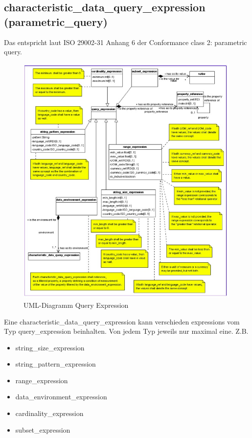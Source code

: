 \subsection{characteristic\_data\_query\_expression (parametric\_query)}\label{sec:characteristicdataqueryexpression}
Das entspricht laut ISO 29002-31 Anhang 6 der Conformance class 2: parametric query.

\begin{figure}[htbp]
	\centering
		\includegraphics[width=0.99\textwidth]{images/query_expression.jpg}
		\caption[UML-Diagramm Query Expression]{UML-Diagramm Query Expression\footnotemark}
	\label{fig:umlqueryexpression}
\end{figure}

Eine characteristic\_data\_query\_expression kann verschieden expressions vom Typ query\_expression beinhalten. Von jedem Typ jeweils nur maximal eine. 
Z.B.
\begin{itemize}
\item string\_size\_expression
\item string\_pattern\_expression
\item range\_expression
\item data\_environment\_expression
\item cardinality\_expression
\item subset\_expression
\end{itemize}

